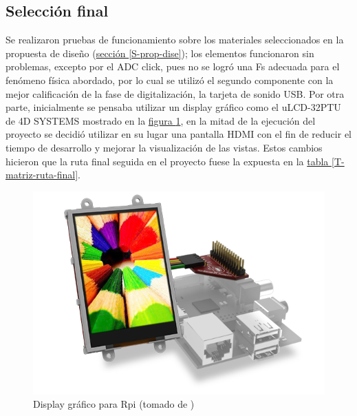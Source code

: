 \documentclass[11pt,lettersize]{article} %
\newcommand{\tabla}[1]{\hyperref[{#1}]{tabla \ref*{#1}}}
\newcommand{\figura}[1]{\hyperref[{#1}]{figura \ref*{#1}}}
\newcommand{\seccion}[1]{\hyperref[{#1}]{sección \ref*{#1}}}
\begin{document}
\subsection{Selección final}
Se realizaron pruebas de funcionamiento sobre los materiales seleccionados en la propuesta de diseño (\seccion{S-prop-dise}); los elementos funcionaron sin problemas, excepto por el ADC click, pues no se logró una Fs adecuada para el fenómeno física abordado, por lo cual se utilizó el segundo componente con la mejor calificación de la fase de digitalización, la tarjeta de sonido USB. Por otra parte, inicialmente se pensaba utilizar un display gráfico como el uLCD-32PTU de 4D SYSTEMS \cite{SYSTEMS2013}
mostrado en la \figura{F-display-grafico}, en la mitad de la ejecución del proyecto se decidió utilizar en su lugar una pantalla HDMI con el fin de reducir el tiempo de desarrollo y mejorar la visualización de las vistas. Estos cambios hicieron que la ruta final seguida en el proyecto fuese la expuesta en la \tabla{T-matriz-ruta-final}.
\begin{figure}[h!]
	\centering
	\includegraphics[width=.6\textwidth]{images/display-grafico.png}
	\caption[Display gráfico para Rpi]{Display gráfico para Rpi (tomado de \cite{SYSTEMS2013})}
	\label{F-display-grafico}
\end{figure}
\end{document}
